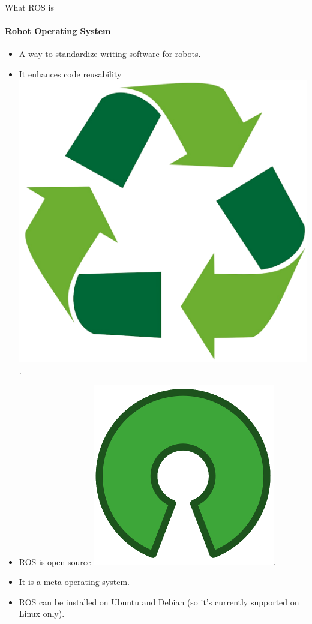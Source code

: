 \documentclass{beamer}
\begin{document}
\begin{frame}{What ROS is}
    \framesubtitle{Robot Operating System}
    \begin{itemize}
        \item A way to standardize writing software for robots.
        \item It enhances {\huge code reusability} \includegraphics[scale=0.02]{figures/recycling.png}.
        \item ROS is open-source \includegraphics[scale=0.09]{figures/open_source.png}.
        \item It is a meta-operating system.
        \item ROS can be installed on Ubuntu and Debian (so it’s currently supported on Linux only).
        

\end{itemize}
\end{frame}
\end{document}
